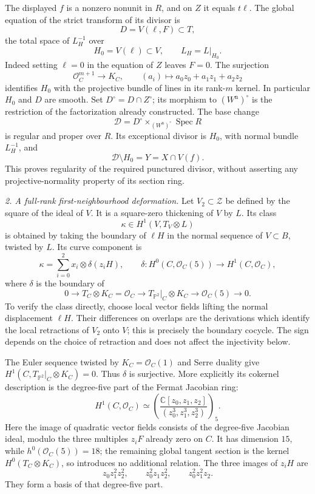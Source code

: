 The displayed $f$ is a nonzero nonunit in $R$, and
on $Z$ it equals $t\ell$. The global equation of
the strict transform of its divisor is
\[
 D=V(\ell,F)\subset T,
\]
the total space of $L_H^{-1}$ over
\[
 H_0=V(\ell)\subset V,
 \qquad L_H=L|_{H_0}.
\]
Indeed setting $\ell=0$ in the equation of $Z$
leaves $F=0$. The surjection
\[
 \mathcal O_C^{m+1}\longrightarrow K_C,
 \qquad (a_i)\longmapsto a_0z_0+a_1z_1+a_2z_2
\]
identifies $H_0$ with the projective bundle of
lines in its rank-$m$ kernel. In particular
$H_0$ and $D$ are smooth. Set $D^\circ=D\cap Z^\circ$;
its morphism to $(W^{\mathrm n})^\circ$ is the
restriction of the factorization already constructed.
The base change
\[
 \mathcal D=D^\circ\times_{(W^{\mathrm n})^\circ}
                              \operatorname{Spec}R
\]
is regular and proper over $R$. Its exceptional
divisor is $H_0$, with normal bundle $L_H^{-1}$,
and
\[
            \mathcal D\setminus H_0=Y=X\cap V(f).
\]
This proves regularity of the required punctured
divisor, without asserting any projective-normality
property of its section ring.

\emph{2. A full-rank first-neighbourhood deformation.}
Let $V_2\subset\mathcal Z$ be defined by the square
of the ideal of $V$. It is a square-zero thickening
of $V$ by $L$. Its class
\[
                   \kappa\in H^1(V,T_V\otimes L)
\]
is obtained by taking the boundary of $\ell H$
in the normal sequence of $V\subset B$, twisted
by $L$. Its curve component is
\begin{equation}\label{eq:C3-KS-components}
       \kappa=\sum_{i=0}^{2}x_i\otimes\delta(z_iH),
 \qquad
 \delta:H^0(C,\mathcal O_C(5))\longrightarrow H^1(C,\mathcal O_C),
\end{equation}
where $\delta$ is the boundary of
\[
 0\longrightarrow T_C\otimes K_C=\mathcal O_C
 \longrightarrow T_{\mathbb P^2}|_C\otimes K_C
 \longrightarrow\mathcal O_C(5)\longrightarrow0.
\]
To verify the class directly, choose local vector
fields lifting the normal displacement $\ell H$.
Their differences on overlaps are the derivations
which identify the local retractions of $V_2$
onto $V$; this is precisely the boundary cocycle.
The sign depends on the choice of retraction and
does not affect the injectivity below.

The Euler sequence twisted by $K_C=\mathcal O_C(1)$
and Serre duality give
$H^1(C,T_{\mathbb P^2}|_C\otimes K_C)=0$.
Thus $\delta$ is surjective. More explicitly its
cokernel description is the degree-five part of
the Fermat Jacobian ring:
\[
 H^1(C,\mathcal O_C)
   \simeq
 \left(\frac{\mathbb C[z_0,z_1,z_2]}
                  {(z_0^3,z_1^3,z_2^3)}\right)_5.
\]
Here the image of quadratic vector fields consists
of the degree-five Jacobian ideal, modulo the
three multiples $z_iF$ already zero on $C$.
It has dimension $15$, while
$h^0(\mathcal O_C(5))=18$; the remaining global
tangent section is the kernel
$H^0(T_C\otimes K_C)$, so introduces no additional
relation. The three images of $z_iH$ are
\[
             z_0z_1^2z_2^2,\qquad
             z_0^2z_1z_2^2,\qquad
             z_0^2z_1^2z_2.
\]
They form a basis of that degree-five part.

